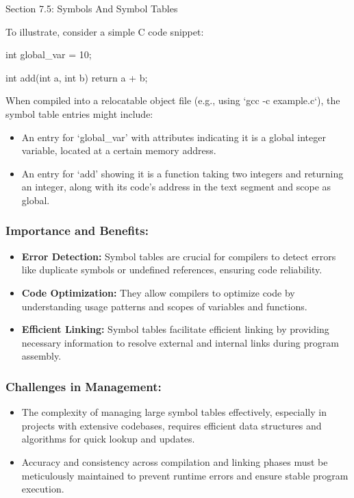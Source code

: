\begin{notes}{Section 7.5: Symbols And Symbol Tables}
    \begin{highlight}
        To illustrate, consider a simple C code snippet:
    \begin{code}[C]
    int global_var = 10;

    int add(int a, int b) {
        return a + b;
    }
    \end{code}
        When compiled into a relocatable object file (e.g., using `gcc -c example.c`), the symbol table entries might include:
        \begin{itemize}
            \item An entry for `global\_var' with attributes indicating it is a global integer variable, located at a certain memory address.
            \item An entry for `add' showing it is a function taking two integers and returning an integer, along with its code's address in the text segment and scope as global.
        \end{itemize}
    \end{highlight}
    
    \subsubsection*{Importance and Benefits:}
    
    \begin{itemize}
        \item \textbf{Error Detection:} Symbol tables are crucial for compilers to detect errors like duplicate symbols or undefined references, ensuring code reliability.
        \item \textbf{Code Optimization:} They allow compilers to optimize code by understanding usage patterns and scopes of variables and functions.
        \item \textbf{Efficient Linking:} Symbol tables facilitate efficient linking by providing necessary information to resolve external and internal links during program assembly.
    \end{itemize}
    
    \subsubsection*{Challenges in Management:}
    
    \begin{itemize}
        \item The complexity of managing large symbol tables effectively, especially in projects with extensive codebases, requires efficient data structures and algorithms for quick lookup and updates.
        \item Accuracy and consistency across compilation and linking phases must be meticulously maintained to prevent runtime errors and ensure stable program execution.
    \end{itemize}    
\end{notes}

